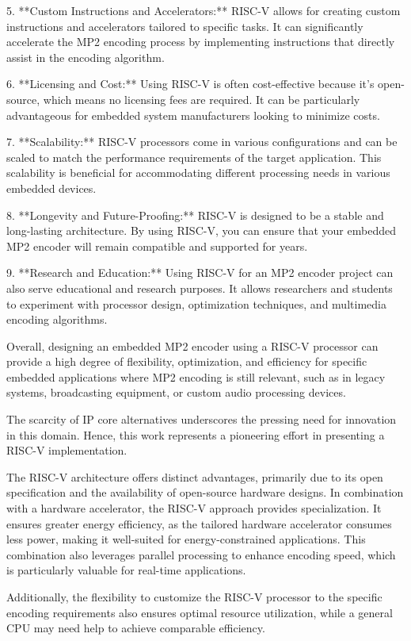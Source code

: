 5. **Custom Instructions and Accelerators:** RISC-V allows for creating custom instructions and accelerators tailored to specific tasks. It can significantly accelerate the MP2 encoding process by implementing instructions that directly assist in the encoding algorithm.

6. **Licensing and Cost:** Using RISC-V is often cost-effective because it's open-source, which means no licensing fees are required. It  can be particularly advantageous for embedded system manufacturers looking to minimize costs.

7. **Scalability:** RISC-V processors come in various configurations and can be scaled to match the performance requirements of the target application. This scalability is beneficial for accommodating different processing needs in various embedded devices.

8. **Longevity and Future-Proofing:** RISC-V is designed to be a stable and long-lasting architecture. By using RISC-V, you can ensure that your embedded MP2 encoder will remain compatible and supported for years.

9. **Research and Education:** Using RISC-V for an MP2 encoder project can also serve educational and research purposes. It allows researchers and students to experiment with processor design, optimization techniques, and multimedia encoding algorithms.

Overall, designing an embedded MP2 encoder using a RISC-V processor can provide a high degree of flexibility, optimization, and efficiency for specific embedded applications where MP2 encoding is still relevant, such as in legacy systems, broadcasting equipment, or custom audio processing devices.

The scarcity of IP core alternatives underscores the pressing need for innovation in this domain. Hence, this work represents a pioneering effort in presenting a RISC-V implementation.

The RISC-V architecture offers distinct advantages, primarily due to its open specification and the availability of open-source hardware designs. In combination with a hardware accelerator, the RISC-V approach provides specialization. It ensures greater energy efficiency, as the tailored hardware accelerator consumes less power, making it well-suited for energy-constrained applications. This combination also leverages parallel processing to enhance encoding speed, which is particularly valuable for real-time applications.

Additionally, the flexibility to customize the RISC-V processor to the specific encoding requirements also ensures optimal resource utilization, while a general CPU may need help to achieve comparable efficiency.

